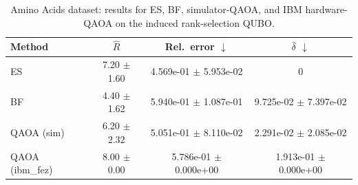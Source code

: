 \begin{table}[t]
\caption{Amino Acids dataset: results for ES, BF, simulator-QAOA, and IBM hardware-QAOA on the induced rank-selection QUBO.}
\label{tab:amino_metrics}
\centering
\scriptsize
\setlength{\tabcolsep}{5pt}
\renewcommand{\arraystretch}{1.05}
\begin{tabular}{@{}lccc@{}}
\toprule
Method & \(\hat{R}\) & Rel.\ error \(\downarrow\) & \(\bar{\delta}\) \(\downarrow\) \\
\midrule
ES                               & 7.20 $\pm$ 1.60 & 4.569e-01 $\pm$ 5.953e-02 & 0 \\
BF                               & 4.40 $\pm$ 1.62 & 5.940e-01 $\pm$ 1.087e-01 & 9.725e-02 $\pm$ 7.397e-02 \\
QAOA (sim)                       & 6.20 $\pm$ 2.32 & 5.051e-01 $\pm$ 8.110e-02 & 2.291e-02 $\pm$ 2.085e-02 \\
QAOA (ibm\_fez)                 & 8.00 $\pm$ 0.00 & 5.786e-01 $\pm$ 0.000e+00 & 1.913e-01 $\pm$ 0.000e+00 \\
\bottomrule
\end{tabular}
\end{table}
